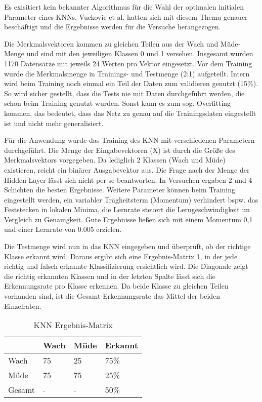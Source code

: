 Es exisitiert kein bekannter Algorithmus für die Wahl der optimalen initialen Parameter eines KNNs. Vuckovic et al. \cite{Vuckovic2002349} hatten sich mit diesem Thema genauer beschäftigt und die Ergebnisse werden für die Versuche herangezogen.

Die Merkmalsvektoren kommen zu gleichen Teilen aus der Wach und Müde-Menge und sind mit den jeweiligen Klassen 0 und 1 versehen. Insgesamt wurden 1170 Datensätze mit jeweils 24 Werten pro Vektor eingesetzt. Vor dem Training wurde die Merkmalsmenge in Trainings- und Testmenge (2:1) aufgeteilt. Intern wird beim Training noch einmal ein Teil der Daten zum validieren genutzt (15\%). So wird sicher gestellt, dass die Tests nie mit Daten durchgeführt werden, die schon beim Training genutzt wurden. Sonst kann es zum sog. Overfitting kommen, das bedeutet, dass das Netz zu genau auf die Trainingsdaten eingestellt ist und nicht mehr generalisiert.

Für die Anwendung wurde das Training des KNN mit verschiedenen Parametern durchgeführt. Die Menge der Eingabevektoren (X) ist durch die Größe des Merkmalsvektors vorgegeben. Da lediglich 2 Klassen (Wach und Müde) existieren, reicht ein binärer Ausgabevektor aus. Die Frage nach der Menge der Hidden Layer lässt sich nicht per se beantworten. In Versuchen ergaben 2 und 4 Schichten die besten Ergebnisse. Weitere Parameter können beim Training eingestellt werden, ein variabler Trägheitsterm (Momentum) verhindert bspw. das Feststecken in lokalen Minima, die Lernrate steuert die Lerngeschwindigkeit im Vergleich zu Genauigkeit. Gute Ergebnisse ließen sich mit einem Momentum 0,1 und einer Lernrate von 0.005 erzielen.

Die Testmenge wird nun in das KNN eingegeben und überprüft, ob der richtige Klasse erkannt wird. Daraus ergibt sich eine Ergebnis-Matrix \ref{tab:ann_results}, in der jede richtig und falsch erkannte Klassifizierung ersichtlich wird. Die Diagonale zeigt die richtig erkannten Klassen und in der letzten Spalte lässt sich die Erkennungsrate pro Klasse erkennen. Da beide Klasse zu gleichen Teilen vorhanden sind, ist die  Gesamt-Erkennungsrate das Mittel der beiden Einzelraten.

\begin{table}[t]
 \centering
 \caption{KNN Ergebnis-Matrix}
 \begin{tabular}{l|lll}
   & Wach & Müde & Erkannt \\ \hline
  Wach & 75 & 25 & 75\%\\  
  Müde & 75 & 75 & 25\%\\ 
  Gesamt & - & - & 50\%\\ 
 \end{tabular}
 \label{tab:ann_results}
\end{table}